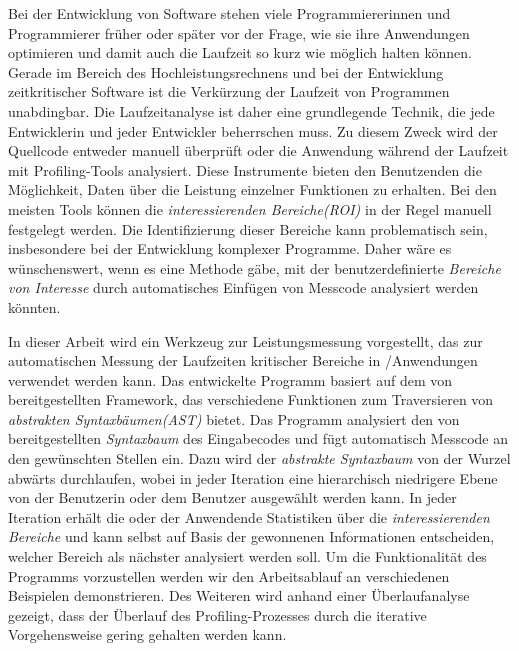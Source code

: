 \documentclass[draft,final]{vutinfth} %
\begin{document}
\begin{kurzfassung*}
Bei der Entwicklung von Software stehen viele Programmiererinnen und Programmierer früher oder später vor der Frage, wie sie ihre Anwendungen optimieren und damit auch die Laufzeit so kurz wie möglich halten können. Gerade im Bereich des Hochleistungsrechnens und bei der Entwicklung zeitkritischer Software ist die Verkürzung der Laufzeit von Programmen unabdingbar. Die Laufzeitanalyse ist daher eine grundlegende Technik, die jede Entwicklerin und jeder Entwickler beherrschen muss. Zu diesem Zweck wird der Quellcode entweder manuell überprüft oder die Anwendung während der Laufzeit mit Profiling-Tools analysiert. Diese Instrumente bieten den Benutzenden die Möglichkeit, Daten über die Leistung einzelner Funktionen zu erhalten. Bei den meisten Tools können die \emph{interessierenden Bereiche}\emph{(ROI)} in der Regel manuell festgelegt werden. Die Identifizierung dieser Bereiche kann problematisch sein, insbesondere bei der Entwicklung komplexer Programme. Daher wäre es wünschenswert, wenn es eine Methode gäbe, mit der benutzerdefinierte \emph{Bereiche von Interesse} durch automatisches Einfügen von Messcode analysiert werden könnten. 

In dieser Arbeit wird ein Werkzeug zur Leistungsmessung vorgestellt, das zur automatischen Messung der Laufzeiten kritischer Bereiche in \C /\CPP Anwendungen verwendet werden kann. Das entwickelte Programm basiert auf dem von \CLANG bereitgestellten Framework, das verschiedene Funktionen zum Traversieren von \emph{abstrakten Syntaxbäumen}\emph{(AST)} bietet. Das Programm analysiert den von \CLANG bereitgestellten \emph{Syntaxbaum} des Eingabecodes und fügt automatisch Messcode an den gewünschten Stellen ein. Dazu wird der \emph{abstrakte Syntaxbaum} von der Wurzel abwärts durchlaufen, wobei in jeder Iteration eine hierarchisch niedrigere Ebene von der Benutzerin oder dem Benutzer ausgewählt werden kann. In jeder Iteration erhält die oder der Anwendende Statistiken über die \emph{interessierenden Bereiche} und kann selbst auf Basis der gewonnenen Informationen entscheiden, welcher Bereich als nächster analysiert werden soll. Um die Funktionalität des Programms vorzustellen werden wir den Arbeitsablauf an verschiedenen Beispielen demonstrieren. Des Weiteren wird anhand einer Überlaufanalyse gezeigt, dass der Überlauf des Profiling-Prozesses durch die iterative Vorgehensweise gering gehalten werden kann.
\end{kurzfassung*}
\end{document}
